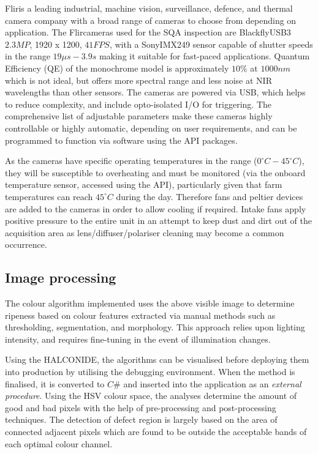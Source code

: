 \documentclass[fleqn,twoside,12pt]{report}
\begin{document}
Flir\textregistered is a leading industrial, machine vision, surveillance, defence, and thermal camera company with a broad range of cameras to choose from depending on application. The Flir\textregistered cameras used for the SQA inspection are Blackfly\textregistered USB3 $2.3 MP$, 1920 x 1200, $41FPS$, with a Sony\textregistered IMX249 sensor capable of shutter speeds in the range $19\mu s-3.9s$ making it suitable for fast-paced applications. Quantum Efficiency (QE) of the monochrome model is approximately $10\%$ at $1000nm$ which is not ideal, but offers more spectral range and less noise at NIR wavelengths than other sensors. The cameras are powered via USB, which helps to reduce complexity, and include opto-isolated I/O for triggering. The comprehensive list of adjustable parameters make these cameras highly controllable or highly automatic, depending on user requirements, and can be programmed to function via software using the API packages. 

As the cameras have specific operating temperatures in the range ($0^{\circ}C-45^{\circ}C$), they will be susceptible to overheating and must be monitored (via the onboard temperature sensor, accessed using the API), particularly given that farm temperatures can reach $45^{\circ}C$ during the day. Therefore fans and peltier devices are added to the cameras in order to allow cooling if required. Intake fans apply positive pressure to the entire unit in an attempt to keep dust and dirt out of the acquisition area as lens/diffuser/polariser cleaning may become a common occurrence.


\subsection{Image processing}


The colour algorithm implemented uses the above visible image to determine ripeness based on colour features extracted via manual methods such as thresholding, segmentation, and morphology. This approach relies upon lighting intensity, and requires fine-tuning in the event of illumination changes. 

Using the HALCON\texttrademark IDE, the algorithms can be visualised before deploying them into production by utilising the debugging environment. When the method is finalised, it is converted to $C\#$ and inserted into the application as an \textit{external procedure}. Using the HSV colour space, the analyses determine the amount of good and bad pixels with the help of pre-processing and post-processing techniques. The detection of defect region is largely based on the area of connected adjacent pixels which are found to be outside the acceptable bands of each optimal colour channel. 
\end{document}

